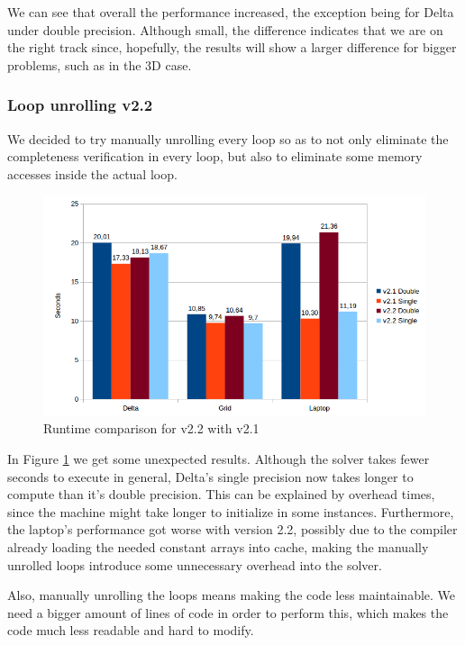\documentclass[12pt, openany]{book}
\begin{document}
 We can see that overall the performance increased, the exception being for Delta under double precision. Although small, the difference indicates that we are on the right track since, hopefully, the results will show a larger difference for bigger problems, such as in the 3D case.
 
\subsubsection{Loop unrolling v2.2}
We decided to try manually unrolling every loop so as to not only eliminate the completeness verification in every loop, but also to eliminate some memory accesses inside the actual loop.

  \begin{figure}[H]
  	\centering
  	\includegraphics[width=\linewidth]{Resources/Images/v22.png}
  	\caption{Runtime comparison for v2.2 with v2.1}
  	\label{fig:v22}
  \end{figure}
  
  In Figure \ref{fig:v22} we get some unexpected results. Although the solver takes fewer seconds to execute in general, Delta's single precision now takes longer to compute than it's double precision. This can be explained by overhead times, since the machine might take longer to initialize in some instances. Furthermore, the laptop's performance got worse with version 2.2, possibly due to the compiler already loading the needed constant arrays into cache, making the manually unrolled loops introduce some unnecessary overhead into the solver.\par
  Also, manually unrolling the loops means making the code less maintainable. We need a bigger amount of lines of code in order to perform this, which makes the code much less readable and hard to modify.
  
\end{document}
